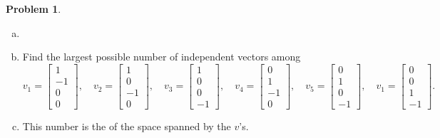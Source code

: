 \documentclass[10pt]{article}
\theoremstyle{definition}
\newtheorem{problem}[theorem]{Problem}
\newcommand{\1}[1]{\textbf{1}_{\left[#1\right]}} %
\begin{document}
\begin{problem}
  \begin{enumerate}[(a)]
    \item[]
    \item  Find the largest possible number of independent vectors among
    \begin{equation*}
      v_{1} =
      \begin{bmatrix}
        1\\-1\\0\\0
      \end{bmatrix},
      \quad
      v_{2} =
      \begin{bmatrix}
        1\\0\\-1\\0
      \end{bmatrix},
      \quad
      v_{3} =
      \begin{bmatrix}
        1\\0\\0\\-1
      \end{bmatrix},
      \quad
      v_{4} =
      \begin{bmatrix}
        0\\1\\-1\\0
      \end{bmatrix},
      \quad
      v_{5} =
      \begin{bmatrix}
        0\\1\\0\\-1
      \end{bmatrix},
      \quad
      v_{1} =
      \begin{bmatrix}
        0\\0\\1\\-1
      \end{bmatrix}.
    \end{equation*}
    \item  This number is the \underline{\phantom{dimension}} of the space spanned by the $v$'s.
  \end{enumerate}
\end{problem}
\end{document}
